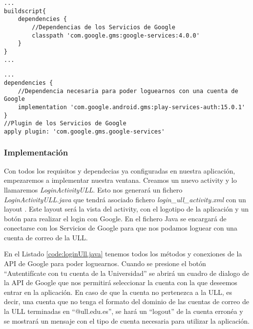 \begin{lstlisting}[caption={Fichero \textit{build.gradle} del proyecto, dependencias para utilizar los Servicios de Google.}, label={lst:googleSd}]
...
buildscript{
    dependencies {
        //Dependencias de los Servicios de Google
        classpath 'com.google.gms:google-services:4.0.0'
    }   
} 
...
\end{lstlisting}
 
\begin{lstlisting}[caption={Fichero \textit{build.gradle} de la aplicación, dependencias y plugin para utilizar los Servicios de Google}, label={lst:googlepluggin}]
...
dependencies {
    //Dependencia necesaria para poder loguearnos con una cuenta de Google
    implementation 'com.google.android.gms:play-services-auth:15.0.1'
}
//Plugin de los Servicios de Google
apply plugin: 'com.google.gms.google-services'
\end{lstlisting}

\subsubsection{ Implementación }

Con todos los requisitos y dependecias ya configuradas en nuestra aplicación, empezaremos a implementar nuestra ventana. Creamos un nuevo activity y lo llamaremos \textit{LoginActivityULL}. Esto nos generará un fichero \textit{LoginActivityULL.java} que tendrá asociado fichero \textit{login\_ull\_activity.xml} con un layout \cite{URL::layout}. Este layout será la vista del activity, con el logotipo de la aplicación y un botón para realizar el login con Google. En el fichero Java se encargará de conectarse con los Servicios de Google para que nos podamos loguear con una cuenta de correo de la ULL.
\bigskip
\bigskip
 
En el Listado \ref{code:loginUll.java} tenemos todos los métodos y conexiones de la API de Google para poder loguearnos. Cuando se presione el botón ``Autentifícate con tu cuenta de la Universidad'' se abrirá un cuadro de dialogo de la API de Google que nos permitirá seleccionar la cuenta con la que deseemos entrar en la aplicación. En caso de que la cuenta no pertenezca a la ULL, es decir, una cuenta que no tenga el formato del dominio de las cuentas de correo de la ULL terminadas en ``@ull.edu.es'', se hará un ``logout'' de la cuenta erronéa y se mostrará un mensaje con el tipo de cuenta necesaria para utilizar la aplicación.

